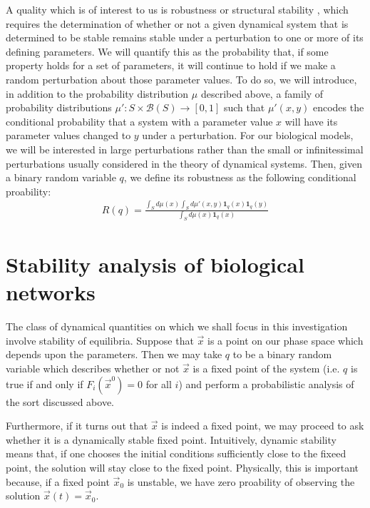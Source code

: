 A quality which is of interest to us is robustness or structural
stability \cite{Smale1967}, which requires the determination of
whether or not a given dynamical system that is determined to be
stable remains stable under a perturbation to one or more of its
defining parameters.  We will quantify this as the probability that,
if some property holds for a set of parameters, it will continue to
hold if we make a random perturbation about those parameter values.
To do so, we will introduce, in addition to the probability
distribution $\mu$ described above, a family of probability
distributions $\mu' \colon S \times \mathcal{B}(S) \to [0,1]$ such
that $\mu'(x,y)$ encodes the conditional probability that a system
with a parameter value $x$ will have its parameter values changed to
$y$ under a perturbation.  For our biological models, we will be
interested in large perturbations rather than the small or
infinitessimal perturbations usually considered in the theory of
dynamical systems.  Then, given a binary random variable $q$,
we define its robustness as the following conditional proability:
\begin{align}\label{eq:robustness}
  R (q) =
  \frac{\int_S d\mu(x) \int_S d\mu'(x,y) \mathbf{1}_q(x) \mathbf{1}_q(y)}
  {\int_S d\mu(x) \mathbf{1}_q(x)}
\end{align}

\section{Stability analysis of biological networks}
The class of dynamical quantities on which we shall focus in this
investigation involve stability of equilibria.  Suppose that $\vec x$
is a point on our phase space which depends upon the parameters.  Then
we may take $q$ to be a binary random variable which describes whether
or not $\vec x$ is a fixed point of the system (i.e. $q$ is true if and only if
$F_i(\vec{x}^0)=0$ for all $i$) and perform a probabilistic analysis
of the sort discussed above.

Furthermore, if it turns out that $\vec x$ is indeed a fixed point, we
may proceed to ask whether it is a dynamically stable fixed point.
Intuitively, dynamic stability means that, if one chooses the initial
conditions sufficiently close to the fixeed point, the solution will
stay close to the fixed point.  Physically, this is important because,
if a fixed point ${\vec x}_0$ is unstable, we have zero proability of
observing the solution ${\vec x}(t) = {\vec x}_0$.

